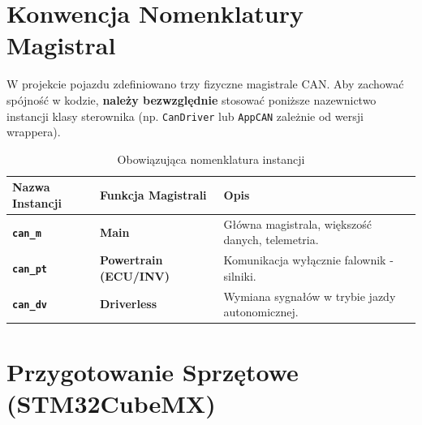 \documentclass[a4paper,11pt]{article}
\begin{document}
\section{Konwencja Nomenklatury Magistral}

W projekcie pojazdu zdefiniowano trzy fizyczne magistrale CAN. Aby zachować spójność w kodzie, \textbf{należy bezwzględnie} stosować poniższe nazewnictwo instancji klasy sterownika (np. \texttt{CanDriver} lub \texttt{AppCAN} zależnie od wersji wrappera).

\begin{table}[H]
\centering
\begin{tabular}{@{}lll@{}}
\toprule
\textbf{Nazwa Instancji} & \textbf{Funkcja Magistrali} & \textbf{Opis} \\ \midrule
\texttt{\textbf{can\_m}} & \textbf{Main} & Główna magistrala, większość danych, telemetria. \\
\texttt{\textbf{can\_pt}} & \textbf{Powertrain (ECU/INV)} & Komunikacja wyłącznie falownik - silniki. \\
\texttt{\textbf{can\_dv}} & \textbf{Driverless} & Wymiana sygnałów w trybie jazdy autonomicznej. \\ \bottomrule
\end{tabular}
\caption{Obowiązująca nomenklatura instancji}
\label{tab:nomenklatura}
\end{table}

\section{Przygotowanie Sprzętowe (STM32CubeMX)}
\end{document}
